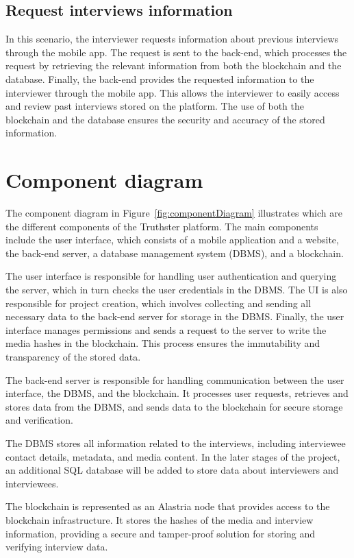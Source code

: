 \documentclass[target=mst,aauheader=]{thud}
\begin{document}
\subsection{Request interviews information}
\label{requestInterviewsInformation}

In this scenario, the interviewer requests information about previous interviews through the mobile app. The request is sent to the back-end, which processes the request by retrieving the relevant information from both the blockchain and the database. Finally, the back-end provides the requested information to the interviewer through the mobile app. This allows the interviewer to easily access and review past interviews stored on the platform. The use of both the blockchain and the database ensures the security and accuracy of the stored information.

\section{Component diagram}

The component diagram in Figure~\ref{fig:componentDiagram} illustrates which are the different components of the Truthster platform. The main components include the user interface, which consists of a mobile application and a website, the back-end server, a database management system (DBMS), and a blockchain.\par

The user interface is responsible for handling user authentication and querying the server, which in turn checks the user credentials in the DBMS. The UI is also responsible for project creation, which involves collecting and sending all necessary data to the back-end server for storage in the DBMS. Finally, the user interface manages permissions and sends a request to the server to write the media hashes in the blockchain. This process ensures the immutability and transparency of the stored data.\par
The back-end server is responsible for handling communication between the user interface, the DBMS, and the blockchain. It processes user requests, retrieves and stores data from the DBMS, and sends data to the blockchain for secure storage and verification.\par
The DBMS stores all information related to the interviews, including interviewee contact details, metadata, and media content. In the later stages of the project, an additional SQL database will be added to store data about interviewers and interviewees.\par
The blockchain is represented as an Alastria node that provides access to the blockchain infrastructure. It stores the hashes of the media and interview information, providing a secure and tamper-proof solution for storing and verifying interview data.
\end{document}
